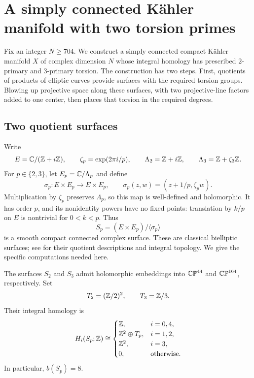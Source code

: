 \section{A simply connected K\"ahler manifold with two torsion primes}
\label{sec:geometry}

Fix an integer $N\geq 704$. We construct a simply connected compact
K\"ahler manifold $X$ of complex dimension $N$ whose integral homology has
prescribed $2$-primary and $3$-primary torsion. The construction has two
steps. First, quotients of products of elliptic curves provide surfaces
with the required torsion groups. Blowing up projective space along these
surfaces, with two projective-line factors added to one center, then
places that torsion in the required degrees.

\subsection{Two quotient surfaces}

Write
\[
 E=\mathbb C/(\mathbb Z+i\mathbb Z),\qquad
 \zeta_p=\exp(2\pi i/p),\qquad
 \Lambda_2=\mathbb Z+i\mathbb Z,\qquad
 \Lambda_3=\mathbb Z+\zeta_3\mathbb Z.
\]
For $p\in\{2,3\}$, let $E_p=\mathbb C/\Lambda_p$ and define
\[
 \sigma_p:E\times E_p\longrightarrow E\times E_p,
 \qquad
 \sigma_p(z,w)=(z+1/p,\zeta_p w).
\]
Multiplication by $\zeta_p$ preserves $\Lambda_p$, so this map is
well-defined and holomorphic. It has order $p$, and its nonidentity
powers have no fixed points: translation by $k/p$ on $E$ is nontrivial
for $0<k<p$. Thus
\[
 S_p=(E\times E_p)/\langle\sigma_p\rangle
\]
is a smooth compact connected complex surface. These are classical bielliptic surfaces; see \cite{Serrano1991,Blomme2025} for their quotient descriptions and integral topology. We give the specific computations needed here.

\begin{lemma}
\label{lem:torsion-surfaces}
The surfaces $S_2$ and $S_3$ admit holomorphic embeddings into
$\mathbb{CP}^{44}$ and $\mathbb{CP}^{164}$, respectively. Set
\[
 T_2=(\mathbb Z/2)^2,\qquad T_3=\mathbb Z/3.
\]
Their integral homology is
\begin{equation}
\label{eq:surface-homology}
 H_i(S_p;\mathbb Z)\cong
 \begin{cases}
  \mathbb Z,&i=0,4,\\
  \mathbb Z^2\oplus T_p,&i=1,2,\\
  \mathbb Z^2,&i=3,\\
  0,&\text{otherwise}.
 \end{cases}
\end{equation}
In particular, $b(S_p)=8$.
\end{lemma}

